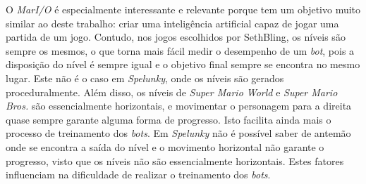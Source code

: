 O \textit{MarI/O} é especialmente interessante e relevante porque tem um
objetivo muito similar ao deste trabalho: criar uma inteligência artificial
capaz de jogar uma partida de um jogo. Contudo, nos jogos escolhidos por
SethBling, os níveis são sempre os mesmos, o que torna mais fácil medir o
desempenho de um \textit{bot}, pois a disposição do nível é sempre igual e o
objetivo final sempre se encontra no mesmo lugar. Este não é o caso em
\textit{Spelunky}, onde os níveis são gerados proceduralmente. Além disso, os
níveis de \textit{Super Mario World} e \textit{Super Mario Bros.} são
essencialmente horizontais, e movimentar o personagem para a direita quase
sempre garante alguma forma de progresso. Isto facilita ainda mais o processo de
treinamento dos \textit{bots}. Em \textit{Spelunky} não é possível saber de
antemão onde se encontra a saída do nível e o movimento horizontal não garante o
progresso, visto que os níveis não são essencialmente horizontais. Estes fatores
influenciam na dificuldade de realizar o treinamento dos \textit{bots}.
